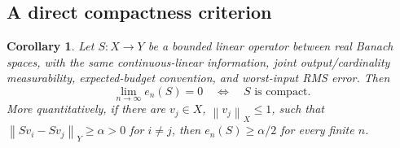 \documentclass[11pt,a4paper]{article}
\newcommand{\norm}[1]{\left\lVert#1\right\rVert}
\newtheorem{corollary}[theorem]{Corollary}
\theoremstyle{definition}
\theoremstyle{remark}
\numberwithin{equation}{section}
\begin{document}
\subsection{A direct compactness criterion}

\begin{corollary}
\label{cor:compactness}
Let \(S:X\to Y\) be a bounded linear operator between real Banach
spaces, with the same continuous-linear information, joint
output/cardinality measurability, expected-budget convention, and
worst-input RMS error. Then
\[
                 \lim_{n\to\infty}e_n(S)=0
                    \quad\Longleftrightarrow\quad
                 S\text{ is compact}.
 \tag{523.9}
\]
More quantitatively, if there are \(v_j\in X\), \(\norm{v_j}_X\le1\),
such that \(\norm{Sv_i-Sv_j}_Y\ge\alpha>0\) for \(i\ne j\), then
\(e_n(S)\ge\alpha/2\) for every finite \(n\).
\end{corollary}
\end{document}

